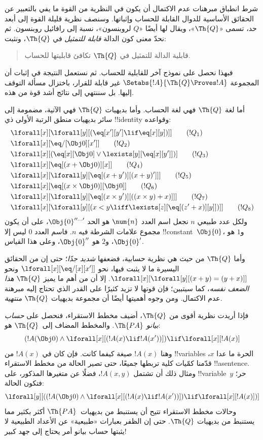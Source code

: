 \documentclass[../../../include/open-logic-section]{subfiles}
\begin{document}

شرط انطباق مبرهنات عدم الاكتمال أن يكون في النظرية من القوة ما يفي
بالتعبير عن الحقائق الأساسية للدوال القابلة للحساب وإثباتها. وسنصف نظرية
قليلة القوة إلى أبعد حد، تسمى «$\Th{Q}$»، ويقال لها أيضًا «$Q$
لروبنسون»، نسبة إلى رافائيل روبنسون. ثم نحدّ معنى كون الدالة
\emph{قابلة للتمثيل} في $\Th{Q}$، ونثبت:
\begin{quote}
  قابلية الدالة للتمثيل في $\Th{Q}$ تكافئ قابليتها للحساب.
\end{quote}
فبهذا نحصل على نموذج آخر للقابلية للحساب. ثم نستعمل النتيجة في إثبات
أن المجموعة $\Setabs{!A}{\Th{Q}\Proves !A}$ غير قابلة للقرار، باختزال
مسألة التوقف إليها. بل سننتهي إلى نتائج أشد قوة من هذه.

أما لغة $\Th{Q}$ فهي لغة الحساب. وأما بديهيات $\Th{Q}$ فهي الآتية،
مضمومة إلى سائر بديهيات منطق الرتبة الأولى ذي !!{identity} وقواعده:
\begin{align*}
& \lforall[x][\lforall[y][(\eq[x'][y'] \lif \eq[x][y])]] \tag{$!Q_1$}\\
& \lforall[x][\eq/[\Obj 0][x']] \tag{$!Q_2$}\\
& \lforall[x][(\eq[x][\Obj 0] \lor \lexists[y][\eq[x][y']])] \tag{$!Q_3$}\\
& \lforall[x][\eq[(x + \Obj 0)][x]] \tag{$!Q_4$}\\
& \lforall[x][\lforall[y][\eq[(x + y')][(x + y)']]] \tag{$!Q_5$}\\
& \lforall[x][\eq[(x \times \Obj 0)][\Obj 0]] \tag{$!Q_6$}\\
& \lforall[x][\lforall[y][\eq[(x \times y')][((x \times y) + x)]]] \tag{$!Q_7$}\\
& \lforall[x][\lforall[y][(x < y \liff \lexists[z][\eq[(z' + x)][y]])]] \tag{$!Q_8$}
\end{align*}
ولكل عدد طبيعي $n$ نجعل اسم العدد $\num{n}$ هو الحد
$\Obj{0}^{\prime\prime\ldots\prime}$، على أن يكون مجموع علامات الشرطة فيه $n$.
فاسم العدد $\num{0}$ ليس إلا !!{constant}~$\Obj{0}$،
و$\num{1}$ هو $\Obj{0}'$، و$\num{2}$ هو $\Obj{0}''$، وعلى هذا القياس.

وأما $\Th{Q}$ من حيث هي نظرية حسابية، فضعفها \emph{شديد جدًا}؛
حتى إن من الحقائق اليسيرة ما لا يثبت فيها، نحو
$\lforall[x][\eq/[x][x']]$ ونحو
$\lforall[x][\lforall[y][(x+y)=(y+x)]]$. إلا أن من أهم ما يميز
$\Th{Q}$ \emph{هذا الضعف نفسه}، كما سيتبين؛ فإن قوتها لا تزيد كثيرًا
على القدر الذي تحتاج إليه مبرهنة عدم الاكتمال. ومن وجوه أهميتها أيضًا
أن مجموعة بديهيات $\Th{Q}$ \emph{منتهية}.

فإذا أريدت نظرية أقوى من $\Th{Q}$، أضيف مخطط الاستقراء، فنحصل على
\emph{حساب بيانو} $\Th{PA}$. والمخطط المضاف إلى~$\Th{Q}$ هو:
\[
(!A(\Obj 0) \land \lforall[x][(!A(x) \lif !A(x'))]) \lif \lforall[x][!A(x)]
\]
وهنا $!A(x)$ صيغة كيفما كانت. فإن كان في $!A(x)$ من !!{variable}s الحرة
ما عدا $x$، قدّمنا كمّيات كلية تربطها جميعًا، حتى تصير الحالة من مخطط
الاستقراء !!a{sentence}. ومثال ذلك أن تشتمل $!A(x,y)$، فضلًا عن متغيرها
المذكور، على !!{variable}~$y$ حر؛ فتكون الحالة:
\[
\lforall[y][((!A(\Obj 0) \land \lforall[x][(!A(x) \lif !A(x'))]) \lif
  \lforall[x][!A(x)])]
\]
وحالات مخطط الاستقراء تتيح أن يستنبط من بديهيات~$\Th{PA}$
أكثر بكثير مما يستنبط من بديهيات $\Th{Q}$. حتى إن الظفر بعبارات
«طبيعية» عن الأعداد الطبيعية لا يثبتها حساب بيانو أمر يحتاج إلى جهد كبير!{}
\end{document}
